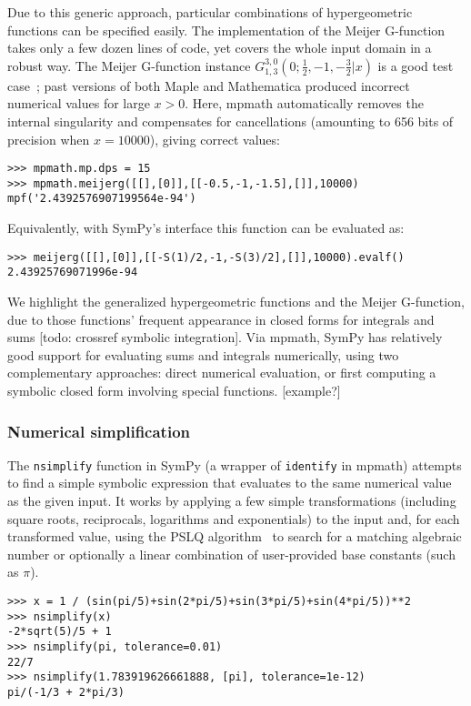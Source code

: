 Due to this generic approach, particular combinations of hypergeometric
functions can be specified easily.
The implementation of the Meijer G-function takes only a few dozen lines of
code, yet covers the whole input domain in a robust way.
The Meijer G-function instance
$G_{1, 3}^{3, 0}\left(0 ; \tfrac{1}{2}, -1, - \tfrac{3}{2} | x \right)$
is a good test case~\cite{Toth2007}; past versions of both Maple and
Mathematica produced incorrect numerical values for large $x > 0$.
Here, mpmath automatically removes the internal singularity
and compensates for cancellations (amounting to 656 bits
of precision when $x = 10000$), giving correct values:
\begin{verbatim}
>>> mpmath.mp.dps = 15
>>> mpmath.meijerg([[],[0]],[[-0.5,-1,-1.5],[]],10000)
mpf('2.4392576907199564e-94')
\end{verbatim}

Equivalently, with SymPy's interface this function can be evaluated as:
\begin{verbatim}
>>> meijerg([[],[0]],[[-S(1)/2,-1,-S(3)/2],[]],10000).evalf()
2.43925769071996e-94
\end{verbatim}

We highlight the generalized hypergeometric functions and
the Meijer G-function, due to those functions' frequent appearance
in closed forms for integrals and sums [todo: crossref symbolic integration].
Via mpmath, SymPy has relatively good support for evaluating sums and integrals
numerically, using two complementary approaches: direct numerical evaluation,
or first computing a symbolic closed form involving special functions. [example?]

\subsubsection{Numerical simplification}

The \texttt{nsimplify} function in SymPy
(a wrapper of \texttt{identify} in mpmath)
attempts to find a simple symbolic
expression that evaluates to the same numerical value as the given
input.
It works by applying a few simple transformations
(including square roots, reciprocals, logarithms and exponentials) to
the input and, for each transformed value,
using the PSLQ algorithm~\cite{Ferguson1999} to search for
a matching algebraic number or optionally a linear combination
of user-provided base constants (such as $\pi$).

\begin{verbatim}
>>> x = 1 / (sin(pi/5)+sin(2*pi/5)+sin(3*pi/5)+sin(4*pi/5))**2
>>> nsimplify(x)
-2*sqrt(5)/5 + 1
>>> nsimplify(pi, tolerance=0.01)
22/7
>>> nsimplify(1.783919626661888, [pi], tolerance=1e-12)
pi/(-1/3 + 2*pi/3)
\end{verbatim}

